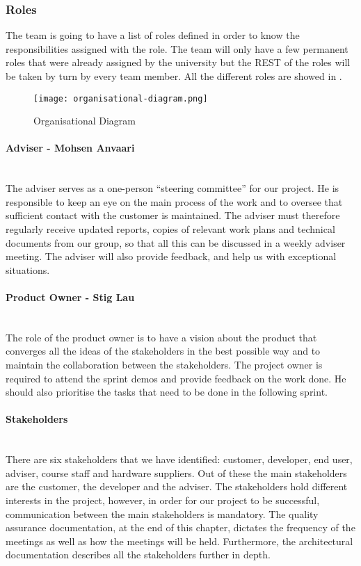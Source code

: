 \documentclass[../document.tex]{subfiles}
\begin{document}
\subsubsection{Roles}
The team is going to have a list of roles defined in order to know the responsibilities assigned with the role. The team will only have a few permanent roles that were already assigned by the university but the \gls{REST} of the roles will be taken by turn by every team member. All the different roles are showed in .
\begin{figure}
\centering
\texttt{[image: organisational-diagram.png]}
\caption{Organisational Diagram}
\label{fig:organisational-diagram}
\end{figure}

\paragraph{Adviser - Mohsen Anvaari} \ \\
The adviser serves as a one-person “steering committee” for our project. He is responsible to keep an eye on the main process of the work and to oversee that sufficient contact with the customer is maintained. The adviser must therefore regularly receive updated reports, copies of relevant work plans and technical documents from our group, so that all this can be discussed in a weekly adviser meeting. The adviser will also provide feedback, and help us with exceptional situations.


\paragraph{Product Owner - Stig Lau} \ \\
The role of the product owner is to have a vision about the product that converges all the ideas of the stakeholders in the best possible way and to maintain the collaboration between the stakeholders. The project owner is required to attend the sprint demos and provide feedback on the work done. He should also prioritise the tasks that need to be done in the following sprint. 

\paragraph{Stakeholders} \ \\
There are six stakeholders that we have identified: customer, developer, end user, adviser, course staff and hardware suppliers. Out of these the main stakeholders are the customer, the developer and the adviser. The stakeholders hold different interests in the project, however, in order for our project to be successful, communication between the main stakeholders is mandatory. The quality assurance documentation, at the end of this chapter, dictates the frequency of the meetings as well as how the meetings will be held. Furthermore, the architectural documentation describes all the stakeholders further in depth.
\end{document}
